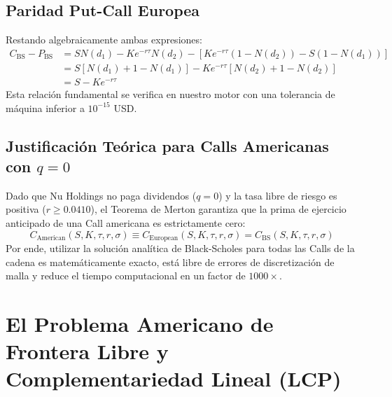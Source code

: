\documentclass[11pt,a4paper]{article}
\begin{document}
\subsection{Paridad Put-Call Europea}
Restando algebraicamente ambas expresiones:
\begin{align*}
    C_{\text{BS}} - P_{\text{BS}} &= S N(d_1) - K e^{-r\tau} N(d_2) - \left[ K e^{-r\tau} (1 - N(d_2)) - S (1 - N(d_1)) \right] \\
    &= S [N(d_1) + 1 - N(d_1)] - K e^{-r\tau} [N(d_2) + 1 - N(d_2)] \\
    &= S - K e^{-r\tau}
\end{align*}
Esta relación fundamental se verifica en nuestro motor con una tolerancia de máquina inferior a $10^{-15}$ USD.

\subsection{Justificación Teórica para Calls Americanas con $q = 0$}
Dado que Nu Holdings no paga dividendos ($q = 0$) y la tasa libre de riesgo es positiva ($r \ge 0.0410$), el Teorema de Merton garantiza que la prima de ejercicio anticipado de una Call americana es estrictamente cero:
\begin{equation}
    C_{\text{American}}(S, K, \tau, r, \sigma) \equiv C_{\text{European}}(S, K, \tau, r, \sigma) = C_{\text{BS}}(S, K, \tau, r, \sigma)
\end{equation}
Por ende, utilizar la solución analítica de Black-Scholes para todas las Calls de la cadena es matemáticamente exacto, está libre de errores de discretización de malla y reduce el tiempo computacional en un factor de $1000\times$.

\newpage
\section{El Problema Americano de Frontera Libre y Complementariedad Lineal (LCP)}
\end{document}
